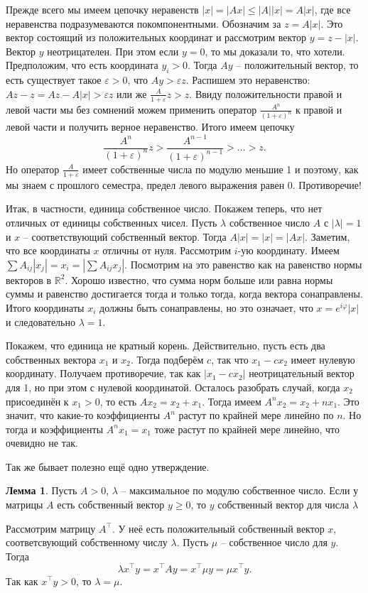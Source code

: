 \documentclass[10pt,a4paper,oneside]{book}
\theoremstyle{definition}
\newtheorem{lem}{{\color{green!50!black} Лемма}}
\newcommand{\mb}[1]{\mathbb{#1}}
\def\ffi{\varphi}
\def\eps{\varepsilon}
\def\lm{\begin{lem}}
\def\elm{\end{lem}}
\begin{document}
Прежде всего мы имеем цепочку неравенств $|x|=|Ax|\leq |A||x|=A|x|$, где все неравенства подразумеваются покомпонентными. Обозначим за $z=A|x|$. Это вектор состоящий из положительных координат и рассмотрим вектор $y=z-|x|$. Вектор $y$ неотрицателен. При этом если $y=0$, то мы доказали то, что хотели. Предположим, что есть координата $y_i>0$. Тогда $Ay$ -- положительный вектор, то есть существует такое $\eps>0$, что $Ay>\eps z$. Распишем это неравенство: $Az - z= Az-A|x|> \eps z$ или же $\frac{A}{1+\eps}z>z$. Ввиду положительности правой и левой части мы без сомнений можем применить оператор $\frac{A^n}{(1+\eps)^n}$ к правой и левой части и получить верное неравенство. Итого имеем цепочку 
$$\frac{A^n}{(1+\eps)^n}z>\frac{A^{n-1}}{(1+\eps)^{n-1}}> \dots > z.$$
Но оператор $\frac{A}{1+\eps}$ имеет собственные числа по модулю меньшие 1 и поэтому, как мы знаем с прошлого семестра, предел левого выражения равен 0. Противоречие!

Итак, в частности, единица собственное число. Покажем теперь, что нет отличных от единицы собственных чисел. Пусть $\lambda$ собственное число $A$ с $|\lambda|=1$ и $x$ -- соответствующий собственный вектор. Тогда $A|x|=|x|=|Ax|$. Заметим, что все координаты $x$ отличны от нуля. Рассмотрим $i$-ую координату. Имеем $\sum A_{ij}|x_j|=x_i=|\sum A_{ij}x_j|$. Посмотрим на это равенство как на равенство нормы векторов в $\mb R^2$. Хорошо известно, что сумма норм больше или равна нормы суммы и равенство достигается тогда и только тогда, когда вектора сонаправлены. Итого координаты $x_i$ должны быть сонаправлены, но это означает, что $x=e^{i\ffi} |x|$ и следовательно $\lambda=1$. 

Покажем, что единица не кратный корень. Действительно, пусть есть два собственных вектора $x_1$ и $x_2$. Тогда подберём $c$, так что $x_1-cx_2$ имеет нулевую координату. Получаем противоречие, так как $|x_1-cx_2|$ неотрицательный вектор для 1, но при этом с нулевой координатой. Осталось разобрать случай, когда $x_2$ присоединён к $x_1>0$, то есть $Ax_2=x_2+x_1$. Тогда имеем $A^nx_2=x_2 +nx_1$. Это значит, что какие-то коэффициенты $A^n$ растут по крайней мере линейно по $n$. Но тогда и коэффициенты $A^nx_1=x_1$ тоже растут по крайней мере линейно, что очевидно не так.
\endproof

Так же бывает полезно ещё одно утверждение. 
\lm Пусть $A>0$, $\lambda$ -- максимальное по модулю собственное число. Если у матрицы $A$ есть собственный вектор $y\geq 0$, то $y$ собственный вектор для числа $\lambda$
\elm
\proof Рассмотрим матрицу $A^{\top}$. У неё есть положительный  собственный вектор $x$, соответсвующий собственному числу $\lambda$. Пусть $\mu$ -- собственное число для $y$. Тогда 
$$\lambda x^{\top}y= x^{\top}Ay=x^{\top}\mu y=\mu x^{\top}y.$$
Так как $x^{\top}y >0$, то $\lambda=\mu$.
\endproof
\end{document}
